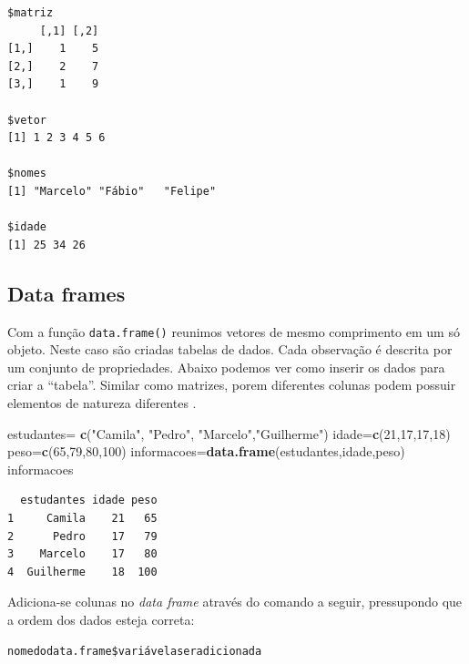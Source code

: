\documentclass[12pt,brazil,oneside]{book}
\newenvironment{Shaded}{\begin{snugshade}}{\end{snugshade}}
\newcommand{\DecValTok}[1]{\textcolor[rgb]{0.00,0.00,0.81}{#1}}
\newcommand{\KeywordTok}[1]{\textcolor[rgb]{0.13,0.29,0.53}{\textbf{#1}}}
\newcommand{\NormalTok}[1]{#1}
\newcommand{\OperatorTok}[1]{\textcolor[rgb]{0.81,0.36,0.00}{\textbf{#1}}}
\newcommand{\StringTok}[1]{\textcolor[rgb]{0.31,0.60,0.02}{#1}}
\begin{document}
\begin{verbatim}
$matriz
     [,1] [,2]
[1,]    1    5
[2,]    2    7
[3,]    1    9

$vetor
[1] 1 2 3 4 5 6

$nomes
[1] "Marcelo" "Fábio"   "Felipe" 

$idade
[1] 25 34 26
\end{verbatim}

\hypertarget{data-frames}{%
\subsection{Data frames}\label{data-frames}}

Com a função \texttt{data.frame()} reunimos vetores de mesmo comprimento em um só objeto. Neste caso são criadas tabelas de dados. Cada observação é descrita por um conjunto de propriedades. Abaixo podemos ver como inserir os dados para criar a ``tabela''. Similar como matrizes, porem diferentes colunas podem possuir elementos de natureza diferentes .

\begin{Shaded}
\begin{Highlighting}[]
\NormalTok{estudantes=}\StringTok{ }\KeywordTok{c}\NormalTok{(}\StringTok{"Camila"}\NormalTok{, }\StringTok{"Pedro"}\NormalTok{, }\StringTok{"Marcelo"}\NormalTok{,}\StringTok{"Guilherme"}\NormalTok{)}
\NormalTok{idade=}\KeywordTok{c}\NormalTok{(}\DecValTok{21}\NormalTok{,}\DecValTok{17}\NormalTok{,}\DecValTok{17}\NormalTok{,}\DecValTok{18}\NormalTok{)}
\NormalTok{peso=}\KeywordTok{c}\NormalTok{(}\DecValTok{65}\NormalTok{,}\DecValTok{79}\NormalTok{,}\DecValTok{80}\NormalTok{,}\DecValTok{100}\NormalTok{)}
\NormalTok{informacoes=}\KeywordTok{data.frame}\NormalTok{(estudantes,idade,peso)}
\NormalTok{informacoes}
\end{Highlighting}
\end{Shaded}

\begin{verbatim}
  estudantes idade peso
1     Camila    21   65
2      Pedro    17   79
3    Marcelo    17   80
4  Guilherme    18  100
\end{verbatim}

Adiciona-se colunas no \emph{data frame} através do comando a seguir, pressupondo que a ordem dos dados esteja correta:

\texttt{nomedodata.frame\$variávelaseradicionada}

\begin{Shaded}
\end{Shaded}
\end{document}
